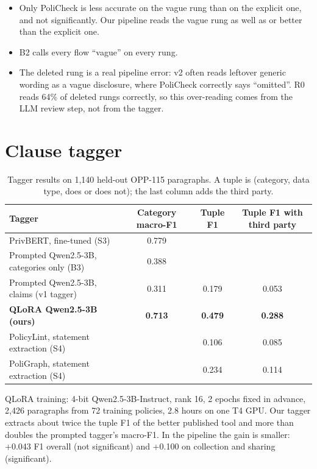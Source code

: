\documentclass[11pt,a4paper]{article}
\begin{document}
\begin{itemize}
  \item Only PoliCheck is less accurate on the vague rung than on the explicit one, and not
        significantly. Our pipeline reads the vague rung as well as or better than the explicit one.
  \item B2 calls every flow ``vague'' on every rung.
  \item The deleted rung is a real pipeline error: v2 often reads leftover generic wording as a
        vague disclosure, where PoliCheck correctly says ``omitted''. R0 reads 64\% of deleted rungs
        correctly, so this over-reading comes from the LLM review step, not from the tagger.
\end{itemize}

\section{Clause tagger}

\begin{table}[H]
\centering
\small
\begin{tabular}{lccc}
\toprule
Tagger & Category macro-F1 & Tuple F1 & Tuple F1 with third party \\
\midrule
PrivBERT, fine-tuned (S3) & 0.779 & & \\
Prompted Qwen2.5-3B, categories only (B3) & 0.388 & & \\
Prompted Qwen2.5-3B, claims (v1 tagger) & 0.311 & 0.179 & 0.053 \\
\textbf{QLoRA Qwen2.5-3B (ours)} & \textbf{0.713} & \textbf{0.479} & \textbf{0.288} \\
PolicyLint, statement extraction (S4) & & 0.106 & 0.085 \\
PoliGraph, statement extraction (S4) & & 0.234 & 0.114 \\
\bottomrule
\end{tabular}
\caption{Tagger results on 1,140 held-out OPP-115 paragraphs. A tuple is (category, data type,
does or does not); the last column adds the third party.}
\end{table}

QLoRA training: 4-bit Qwen2.5-3B-Instruct, rank 16, 2 epochs fixed in advance, 2,426 paragraphs
from 72 training policies, 2.8 hours on one T4 GPU. Our tagger extracts about twice the tuple F1 of
the better published tool and more than doubles the prompted tagger's macro-F1. In the pipeline the
gain is smaller: +0.043 F1 overall (not significant) and +0.100 on collection and sharing
(significant).
\end{document}
